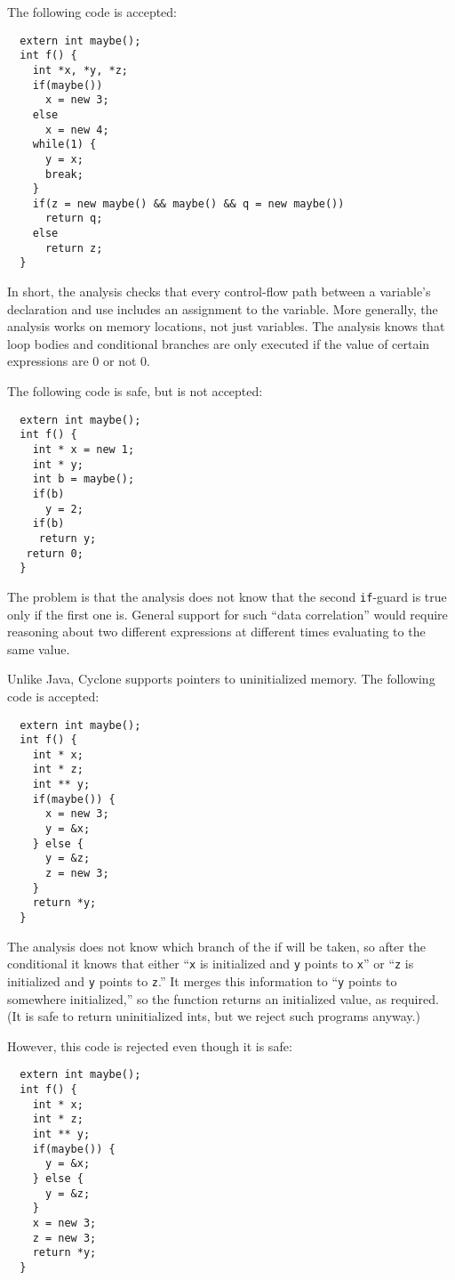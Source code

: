The following code is accepted:
\begin{verbatim}
  extern int maybe();
  int f() {
    int *x, *y, *z;
    if(maybe())
      x = new 3;
    else
      x = new 4;
    while(1) {
      y = x;
      break;
    }
    if(z = new maybe() && maybe() && q = new maybe())
      return q;
    else
      return z;
  }
\end{verbatim}

In short, the analysis checks that every control-flow path between a
variable's declaration and use includes an assignment to the variable.
More generally, the analysis works on memory locations, not just
variables.  The analysis knows that loop bodies and conditional
branches are only executed if the value of certain expressions are 0
or not 0.

The following code is safe, but is not accepted:
\begin{verbatim}
  extern int maybe();
  int f() {
    int * x = new 1;
    int * y;
    int b = maybe();
    if(b) 
      y = 2;
    if(b)
     return y;
   return 0;
  }
\end{verbatim}

The problem is that the analysis does not know that the second
\texttt{if}-guard is true only if the first one is.  General support for
such ``data correlation'' would require reasoning about two different
expressions at different times evaluating to the same value.

Unlike Java, Cyclone supports pointers to uninitialized memory.  The
following code is accepted:
\begin{verbatim}
  extern int maybe();
  int f() {
    int * x;
    int * z;
    int ** y;
    if(maybe()) {
      x = new 3;
      y = &x;
    } else {
      y = &z;
      z = new 3;
    }
    return *y;
  }
\end{verbatim}

The analysis does not know which branch of the if will be taken, so
after the conditional it knows that either ``\texttt{x} is initialized
and \texttt{y} points to \texttt{x}'' or ``\texttt{z} is initialized and
\texttt{y} points to \texttt{z}.''  It merges this information to
``\texttt{y} points to somewhere initialized,'' so the function returns
an initialized value, as required.  (It is safe to return
uninitialized ints, but we reject such programs anyway.)

However, this code is rejected even though it is safe:
\begin{verbatim}
  extern int maybe();
  int f() {
    int * x;
    int * z;
    int ** y;
    if(maybe()) {
      y = &x;
    } else {
      y = &z;
    }
    x = new 3;
    z = new 3;
    return *y;
  }
\end{verbatim}

